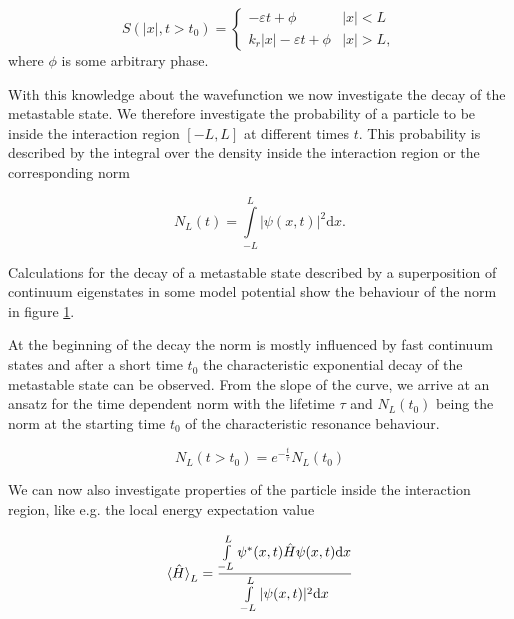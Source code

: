 \begin{equation}    \label{equation:phase_function}
  S(|x|,t>t_0) = \begin{cases}
                   -\varepsilon t + \phi         & |x| < L \\
                   k_r |x| -\varepsilon t + \phi & |x| > L   ,
                 \end{cases}
\end{equation}
where $\phi$ is some arbitrary phase.


With this knowledge about the wavefunction we now investigate the decay
of the metastable state. We therefore investigate the probability of a particle
to be inside the interaction region $[-L,L]$ at different times $t$. This
probability is described by the integral over the density inside the interaction
region or the corresponding norm

\begin{equation}
  N_L(t) = \int\limits_{-L}^L |\psi(x,t)|^2 \mathrm d x .
\end{equation}

Calculations for the decay of a metastable state described by a superposition
of continuum eigenstates in some model potential
show the behaviour of the norm in figure \ref{figure:decay_norm}.

\begin{figure}[h]
  \centering
  \caption{}
  \label{figure:decay_norm}
\end{figure}

At the beginning of the decay the norm is mostly influenced by fast
continuum states and after a short time $t_0$ the characteristic
exponential decay of the metastable state can be observed. From the slope
of the curve, we arrive at an ansatz for the time dependent norm with
the lifetime $\tau$ and $N_L(t_0)$ being the norm at the starting time
$t_0$ of the characteristic resonance behaviour.

\begin{equation}
  N_L(t>t_0) = e^{-\frac t\tau} N_L(t_0)
\end{equation}

We can now also investigate properties of the particle inside the
interaction region, like e.g. the local energy expectation value

\begin{equation}
  \braket{\hat{H}}_L = \frac{\int\limits_{-L}^L \psi^*(x,t) \hat{H} \psi(x,t) \mathrm dx}
                       {\int\limits_{-L}^L |\psi(x,t)|^2 \mathrm dx}
\end{equation}

